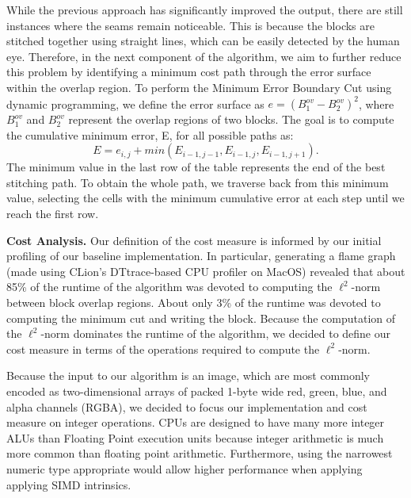 \documentclass[letterpaper]{article}
\newcommand{\mypar}[1]{{\bf #1.}}
\begin{document}
While the previous approach has significantly improved the output, there are still instances where the seams remain noticeable. This is because the blocks are stitched together using straight lines, which can be easily detected by the human eye. Therefore, in the next component of the algorithm, we aim to further reduce this problem by identifying a minimum cost path through the error surface within the overlap region. To perform the Minimum Error Boundary Cut using dynamic programming, we define the error surface as ${e = (B^{ov}_{1} - B^{ov}_{2})^{2}}$, where ${B^{ov}_{1}}$ and ${B^{ov}_{2}}$ represent the overlap regions of two blocks. The goal is to compute the cumulative minimum error, E, for all possible paths as:
\[ E = e_{i,j} + min(E_{i-1,j-1}, E_{i-1,j}, E_{i-1,j+1}). \]
The minimum value in the last row of the table represents the end of the best stitching path. To obtain the whole path, we traverse back from this minimum value, selecting the cells with the minimum cumulative error at each step until we reach the first row.

\mypar{Cost Analysis} Our definition of the cost measure is informed by our initial profiling of our baseline implementation. In particular, generating a flame graph (made using CLion's DTtrace-based CPU profiler on MacOS) revealed that about 85\% of the runtime of the algorithm was devoted to computing the $\ell ^2$-norm between block overlap regions. About only 3\% of the runtime was devoted to computing the minimum cut and writing the block. Because the computation of the $\ell ^2$-norm dominates the runtime of the algorithm, we decided to define our cost measure in terms of the operations required to compute the $\ell ^2$-norm.

Because the input to our algorithm is an image, which are most commonly encoded as two-dimensional arrays of packed 1-byte wide red, green, blue, and alpha channels (RGBA), we decided to focus our implementation and cost measure on integer operations. CPUs are designed to have many more integer ALUs than Floating Point execution units because integer arithmetic is much more common than floating point arithmetic. Furthermore, using the narrowest numeric type appropriate would allow higher performance when applying applying SIMD intrinsics.
\end{document}
